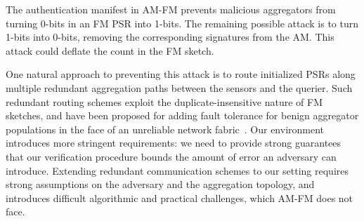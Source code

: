 \documentclass[10pt,twocolumn]{article}
\newcommand{\amfm}{AM-FM\xspace}
\newcommand{\am}{authentication manifest\xspace}
\begin{document}
\label{sec:YesNo}
\vspace{-1em}
The \am in \amfm prevents malicious aggregators from turning
0-bits in an FM PSR into 1-bits.  The remaining possible attack is
to turn 1-bits into 0-bits, removing the corresponding signatures
from the AM.  This attack could deflate the count in the FM sketch.

One natural approach to preventing this attack is to route initialized 
PSRs along multiple redundant aggregation paths between the sensors and 
the querier. 
Such redundant routing schemes exploit the duplicate-insensitive nature of
FM sketches, and have been proposed for adding fault tolerance for benign 
aggregator populations in the face of an unreliable network 
fabric~\cite{Manjhi2005}.
Our environment introduces more stringent requirements: we need to provide 
strong guarantees that our verification procedure bounds the amount of 
error an adversary can introduce.
Extending redundant communication schemes to our setting requires strong 
assumptions on the adversary and the aggregation topology,
and introduces difficult algorithmic and practical challenges, which
\amfm does not face.
\end{document}

